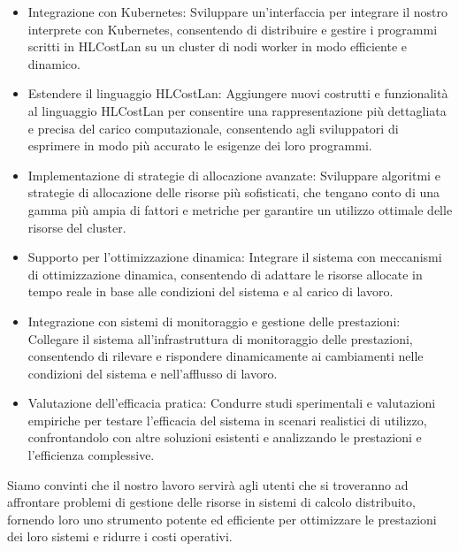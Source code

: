 \documentclass[../../main.tex]{subfiles}
\begin{document}
\begin{itemize}
    \item Integrazione con Kubernetes: Sviluppare un'interfaccia per integrare il nostro interprete con Kubernetes, consentendo di distribuire e gestire i programmi scritti in HLCostLan su un cluster di nodi worker in modo efficiente e dinamico.
    \item Estendere il linguaggio HLCostLan: Aggiungere nuovi costrutti e funzionalità al linguaggio HLCostLan per consentire una rappresentazione più dettagliata e precisa del carico computazionale, consentendo agli sviluppatori di esprimere in modo più accurato le esigenze dei loro programmi.
    \item Implementazione di strategie di allocazione avanzate: Sviluppare algoritmi e strategie di allocazione delle risorse più sofisticati, che tengano conto di una gamma più ampia di fattori e metriche per garantire un utilizzo ottimale delle risorse del cluster.
    \item Supporto per l'ottimizzazione dinamica: Integrare il sistema con meccanismi di ottimizzazione dinamica, consentendo di adattare le risorse allocate in tempo reale in base alle condizioni del sistema e al carico di lavoro.
    \item  Integrazione con sistemi di monitoraggio e gestione delle prestazioni: Collegare il sistema all'infrastruttura di monitoraggio delle prestazioni, consentendo di rilevare e rispondere dinamicamente ai cambiamenti nelle condizioni del sistema e nell'afflusso di lavoro.
    \item Valutazione dell'efficacia pratica: Condurre studi sperimentali e valutazioni empiriche per testare l'efficacia del sistema in scenari realistici di utilizzo, confrontandolo con altre soluzioni esistenti e analizzando le prestazioni e l'efficienza complessive.
\end{itemize}

Siamo convinti che il nostro lavoro servirà agli utenti che si troveranno ad affrontare problemi di gestione delle risorse in sistemi di calcolo distribuito, fornendo loro uno strumento potente ed efficiente per ottimizzare le prestazioni dei loro sistemi e ridurre i costi operativi.
\end{document}
